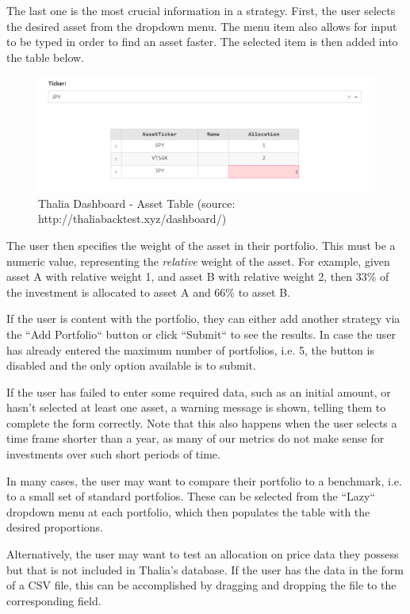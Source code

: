 \documentclass[main.tex]{subfiles}
\begin{document}
The last one is the most crucial information in a strategy. First, the user selects the desired asset from the dropdown menu. The menu item also allows for input to be typed in order to find an asset faster. The selected item is then added into the table below.

\begin{figure}[H]
   \centering
   \includegraphics[width=\textwidth]{08Appendices/081User/081Pictures/table.png}
   \caption{Thalia Dashboard - Asset Table (source: http://thaliabacktest.xyz/dashboard/)}
   \label{thalia_table}
\end{figure}


The user then specifies the weight of the asset in their portfolio. This must be a numeric value, representing the \textit{relative} weight of the asset. For example, given asset A with relative weight 1, and asset B with relative weight 2, then 33\% of the investment is allocated to asset A and 66\% to asset B.

If the user is content with the portfolio, they can either add another strategy via the ``Add Portfolio`` button or click ``Submit`` to see the results. In case the user has already entered the maximum number of portfolios, i.e. 5, the button is disabled and the only option available is to submit.

If the user has failed to enter some required data, such as an initial amount, or hasn't selected at least one asset, a warning message is shown, telling them to complete the form correctly. Note that this also happens when the user selects a time frame shorter than a year, as many of our metrics do not make sense for investments over such short periods of time.

In many cases, the user may want to compare their portfolio to a benchmark, i.e. to a small set of standard portfolios. These can be selected from the ``Lazy`` dropdown menu at each portfolio, which then populates the table with the desired proportions.

Alternatively, the user may want to test an allocation on price data they possess but that is not included in Thalia's database. If the user has the data in the form of a CSV file, this can be accomplished by dragging and dropping the file to the corresponding field.
\end{document}
